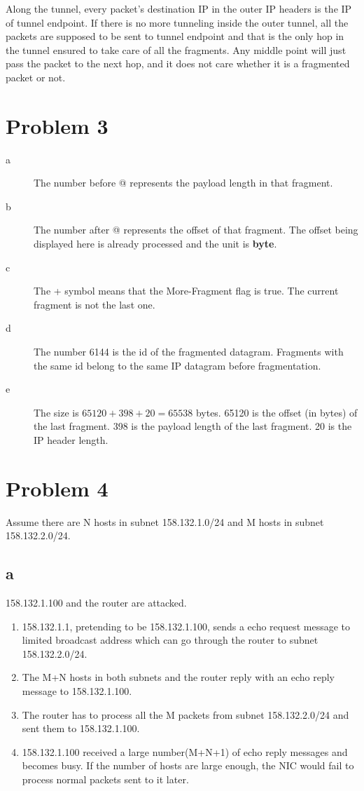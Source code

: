 \documentclass[11pt]{article}
\begin{document}
Along the tunnel, every packet's destination IP in the outer IP headers is the IP of tunnel endpoint. If there is no more tunneling inside the outer tunnel, all the packets are supposed to be sent to tunnel endpoint and that is the only hop in the tunnel ensured to take care of all the fragments. Any middle point will just pass the packet to the next hop, and it does not care whether it is a fragmented packet or not.

\section{Problem 3}
\begin{description}
\item[a] The number before @ represents the payload length in that fragment.
\item[b] The number after @ represents the offset of that fragment. The offset being displayed here is already processed and the unit is \textbf{byte}.
\item[c] The + symbol means that the More-Fragment flag is true. The current fragment is not the last one.
\item[d] The number 6144 is the id of the fragmented datagram. Fragments with the same id belong to the same IP datagram before fragmentation.
\item[e] The size is $65120+398+20=65538$ bytes. 65120 is the offset (in bytes) of the last fragment. 398 is the payload length of the last fragment. 20 is the IP header length.
\end{description}

\section{Problem 4}
Assume there are N hosts in subnet 158.132.1.0/24 and M hosts in subnet 158.132.2.0/24.

\subsection{a}
158.132.1.100 and the router are attacked.

\begin{enumerate}
\item 158.132.1.1, pretending to be 158.132.1.100, sends a echo request message to limited broadcast address which can go through the router to subnet 158.132.2.0/24.
\item The M+N hosts in both subnets and the router reply with an echo reply message to 158.132.1.100.
\item The router has to process all the M packets from subnet 158.132.2.0/24 and sent them to 158.132.1.100.
\item 158.132.1.100 received a large number(M+N+1) of echo reply messages and becomes busy. If the number of hosts are large enough, the NIC would fail to process normal packets sent to it later.
\end{enumerate}
\end{document}
